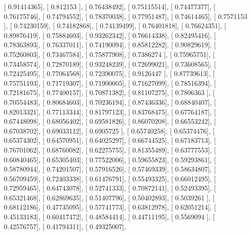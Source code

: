 \documentclass{article}
\begin{document}
       [ 0.91414365],
       [ 0.812153  ],
       [ 0.76438492],
       [ 0.75115514],
       [ 0.74477377],
       [ 0.76175746],
       [ 0.74794552],
       [ 0.78370038],
       [ 0.77951487],
       [ 0.74614465],
       [ 0.7571153 ],
       [ 0.74230159],
       [ 0.74182868],
       [ 0.74139499],
       [ 0.76401818],
       [ 0.76624351],
       [ 0.89876419],
       [ 0.75884603],
       [ 0.93262342],
       [ 0.76614338],
       [ 0.82495416],
       [ 0.78363893],
       [ 0.76337011],
       [ 0.74190094],
       [ 0.85812282],
       [ 0.90829619],
       [ 0.75260803],
       [ 0.73467584],
       [ 0.75877908],
       [ 0.7386274 ],
       [ 0.75965751],
       [ 0.73458574],
       [ 0.72870189],
       [ 0.93248239],
       [ 0.72699021],
       [ 0.73608565],
       [ 0.72425495],
       [ 0.77064568],
       [ 0.72390075],
       [ 0.9126447 ],
       [ 0.87739613],
       [ 0.75751193],
       [ 0.71719307],
       [ 0.71900005],
       [ 0.71627099],
       [ 0.78516394],
       [ 0.72181675],
       [ 0.77400157],
       [ 0.70871382],
       [ 0.81107275],
       [ 0.7806363 ],
       [ 0.70554483],
       [ 0.80684603],
       [ 0.70236194],
       [ 0.87436336],
       [ 0.68840407],
       [ 0.82013321],
       [ 0.77113344],
       [ 0.81797123],
       [ 0.83768475],
       [ 0.67764187],
       [ 0.67448098],
       [ 0.68056402],
       [ 0.69581826],
       [ 0.86070208],
       [ 0.66553242],
       [ 0.67038702],
       [ 0.69033112],
       [ 0.6905725 ],
       [ 0.65740258],
       [ 0.65374476],
       [ 0.65374302],
       [ 0.64570951],
       [ 0.64025297],
       [ 0.66744525],
       [ 0.67183713],
       [ 0.76701062],
       [ 0.68760082],
       [ 0.62275755],
       [ 0.81355489],
       [ 0.63777553],
       [ 0.60840465],
       [ 0.65305403],
       [ 0.77522006],
       [ 0.59655823],
       [ 0.59293861],
       [ 0.58780944],
       [ 0.74201507],
       [ 0.57916526],
       [ 0.57469339],
       [ 0.58634807],
       [ 0.56709459],
       [ 0.72403338],
       [ 0.61476791],
       [ 0.55493325],
       [ 0.66012495],
       [ 0.72959465],
       [ 0.64743078],
       [ 0.52741333],
       [ 0.70872141],
       [ 0.52493395],
       [ 0.65321468],
       [ 0.62869635],
       [ 0.51407796],
       [ 0.50402893],
       [ 0.5039261 ],
       [ 0.68112186],
       [ 0.47735095],
       [ 0.57741773],
       [ 0.63812978],
       [ 0.62051214],
       [ 0.45133183],
       [ 0.60417472],
       [ 0.48584414],
       [ 0.44711195],
       [ 0.5569094 ],
       [ 0.42576757],
       [ 0.41794311],
       [ 0.49325007],
\end{document}
